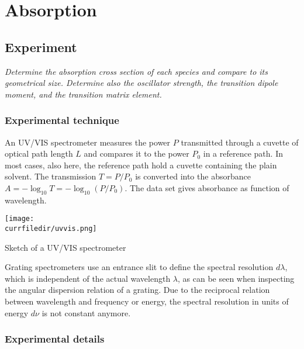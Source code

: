 

\chapter{Absorption}

\vspace*{12mm}





\section{Experiment}

\textit{Determine the absorption cross section of each species and compare to its geometrical size. Determine also the oscillator strength, the transition dipole moment, and the transition matrix element.}


\subsection{Experimental technique}

An UV/VIS spectrometer measures the  power $P$ transmitted through a cuvette of optical path length $L$ and compares it to the power $P_0$ in a reference path. In most cases, also here, the reference path hold a cuvette containing  the plain solvent. The transmission $T = P / P_0$ is converted into the absorbance $A = - \log_{10} T = - \log_{10} ( P / P_0)$. The data set gives absorbance as function of wavelength.

\begin{marginfigure}
\texttt{[image: \\currfiledir/uvvis.png]}
\caption{Sketch of a UV/VIS spectrometer}
\end{marginfigure}



Grating spectrometers use an entrance slit to define the spectral resolution $d \lambda$, which is independent of the actual wavelength $\lambda$, as can be seen when inspecting the   angular dispersion relation of a grating. Due to the reciprocal relation between wavelength and frequency or energy, the spectral resolution in units of energy $d \nu$ is not constant anymore.


\subsection{Experimental details}

